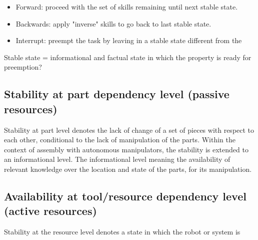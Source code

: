 \documentclass[a4paper,10pt]{article}
\begin{document}
\begin{itemize}
	\item Forward: proceed with the set of skills remaining until next stable state.
	\item Backwards: apply "inverse" skills to go back to last stable state.
	\item Interrupt: preempt the task by leaving in a stable state different from the 
\end{itemize}



Stable state = informational and factual state in which the property is ready for preemption? 


\subsection{Stability at part dependency level (passive resources)}

Stability at part level denotes the lack of change of a set of pieces with respect to each other, conditional to the lack of manipulation of the parts. Within the context of assembly with autonomous manipulators, the stability is extended to an informational level. The informational level meaning the availability of relevant knowledge over the location and state of the parts, for its manipulation.



\subsection{Availability at tool/resource dependency level (active resources)}

Stability at the resource level denotes a state in which the robot or system is  


\end{document}
